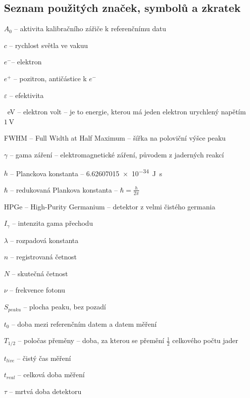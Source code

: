 \documentclass[12pt,a4paper]{article}
\newcommand{\e}{$e^-$}
\begin{document}
\begin{spacing}{1.5}
\section*{Seznam použitých značek, symbolů a zkratek}
\begin{spacing}{1.2}
	\begin{list}{}{}
		\item $A_0$ -- aktivita kalibračního zářiče k referenčnímu datu
		\item $c$ -- rychlost světla ve vakuu %
		\item \e -- elektron%
		\item $e^+$ -- pozitron, antičástice k \e	
		\item $\varepsilon$ -- efektivita
		\item \SI{}{\electronvolt} -- elektron volt -- je to energie, kterou má jeden elektron urychlený napětím $\SI{1}{\volt}$
		\item FWHM -- Full Width at Half Maximum -- šířka na poloviční výšce peaku
		\item $\gamma$ -- gama záření -- elektromagnetické záření, původem z jaderných reakcí
		\item $h$ -- Planckova konstanta -- \SI{6.62607015e-34}{\joule\second} 
		\item $\hbar$ -- redukovaná Plankova konstanta -- $\hbar = \frac{h}{2\pi}$
		\item HPGe -- High-Purity Germanium -- detektor z velmi čistého germania
		\item $I_\gamma$ -- intenzita gama přechodu
		\item $\lambda$ -- rozpadová konstanta %
		\item $n$ -- registrovaná četnost
		\item $N$ -- skutečná četnost
		\item $\nu$ -- frekvence fotonu
		\item $S_{peaku}$ -- plocha peaku, bez pozadí
		\item $t_0$ -- doba mezi referenčním datem a datem měření
		\item $T_{1/2}$ -- poločas přeměny -- doba, za kterou se přemění $\frac{1}{2}$ celkového počtu jader
		\item $t_{live}$ -- čistý čas měření
		\item $t_{real}$ -- celková doba měření
		\item $\tau$ -- mrtvá doba detektoru	
	\end{list}
\end{spacing}
\newpage
{}

\end{spacing}
\end{document}
